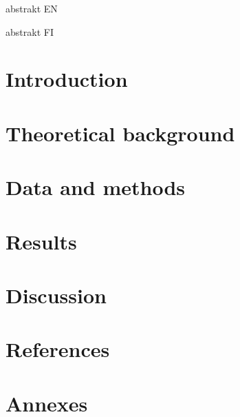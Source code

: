 \documentclass[a4paper,11pt]{article}
\begin{document}
\newpage
abstrakt EN

\newpage
abstrakt FI

\newpage
\tableofcontents

\newpage
\section{Introduction}

\newpage
\section{Theoretical background}

\newpage
\section{Data and methods}

\newpage
\section{Results}

\newpage
\section{Discussion}

\newpage
\section{References}
\renewcommand{\refname}{}


\newpage
\section{Annexes}
\end{document}
